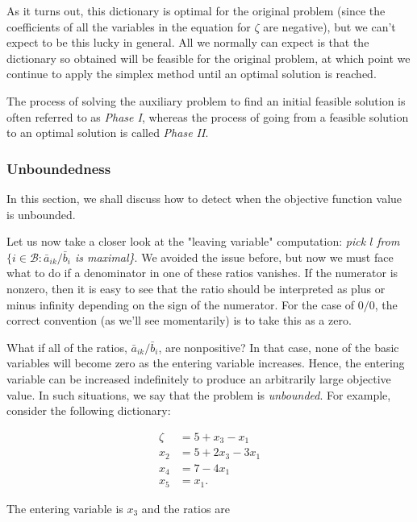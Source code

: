 \documentclass{article}
\begin{document}
    As it turns out, this dictionary is optimal for the original problem (since the coefficients of all the variables in the equation for \( \zeta \) are negative), but we can't expect to be this lucky in general. All we normally can expect is that the dictionary so obtained will be feasible for the original problem, at which point we continue to apply the simplex method until an optimal solution is reached.
    
    The process of solving the auxiliary problem to find an initial feasible solution is often referred to as \emph{Phase I}, whereas the process of going from a feasible solution to an optimal solution is called \emph{Phase II}.
    
    \subsubsection{Unboundedness}
    
    In this section, we shall discuss how to detect when the objective function value is unbounded.
    
    Let us now take a closer look at the "leaving variable" computation: \emph{pick \( l \) from \( \{i \in \mathcal{B} : \bar{a}_{ik}/\bar{b}_{i} \) is maximal\}}. We avoided the issue before, but now we must face what to do if a denominator in one of these ratios vanishes. If the numerator is nonzero, then it is easy to see that the ratio should be interpreted as plus or minus infinity depending on the sign of the numerator. For the case of \( 0/0 \), the correct convention (as we'll see momentarily) is to take this as a zero.
    
    What if all of the ratios, \( \bar{a}_{ik}/\bar{b}_{i} \), are nonpositive? In that case, none of the basic variables will become zero as the entering variable increases. Hence, the entering variable can be increased indefinitely to produce an arbitrarily large objective value. In such situations, we say that the problem is \emph{unbounded}. For example, consider the following dictionary:
    
    \[
    \begin{split}
    \zeta &= 5 + x_{3} - x_{1} \\
    x_2 &= 5 + 2x_{3} - 3x_{1} \\
    x_4 &= 7 - 4x_{1} \\
    x_5 &= x_{1}.
    \end{split}
    \]
    
    The entering variable is \( x_{3} \) and the ratios are
    
\end{document}
